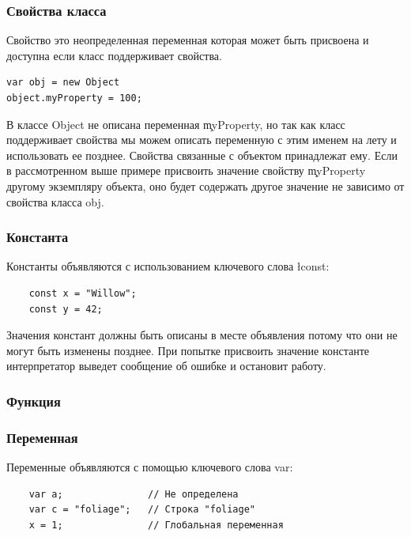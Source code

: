 \documentclass[11pt,russian,a4paper]{article}
\begin{document}
\subsubsection{Свойства класса}

Свойство это неопределенная переменная которая может быть
присвоена и доступна если класс поддерживает свойства.

\begin{verbatim}
var obj = new Object
object.myProperty = 100;
\end{verbatim}

В классе Object не описана переменная \c myProperty, но так как
класс поддерживает свойства мы можем описать переменную
с этим именем на лету и использовать ее позднее.
Свойства связанные с объектом принадлежат ему. Если в рассмотренном
выше примере присвоить значение свойству \c myProperty другому
экземпляру объекта, оно будет содержать другое значение не зависимо
от свойства класса obj.

\subsubsection{Константа}

Константы объявляются с использованием ключевого слова \l const:

\begin{verbatim}
    const x = "Willow";
    const y = 42;
\end{verbatim}

Значения констант должны быть описаны в месте объявления
потому что они не могут быть изменены позднее.
При попытке присвоить значение константе интерпретатор
выведет сообщение об ошибке и остановит работу.

\subsubsection{Функция}


\subsubsection{Переменная}

Переменные объявляются с помощью ключевого слова var:

\begin{verbatim}
    var a;               // Не определена
    var c = "foliage";   // Строка "foliage"
    x = 1;               // Глобальная переменная

\end{verbatim}
\end{document}
